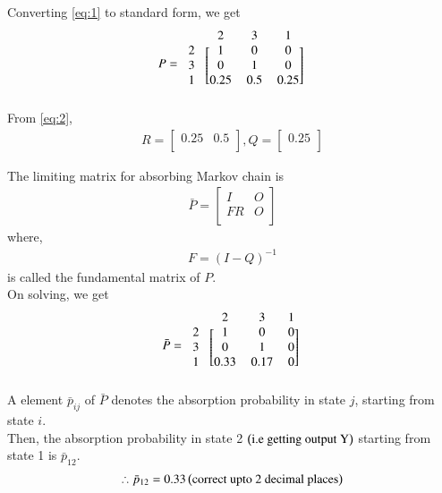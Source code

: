 \documentclass[journal,12pt,twocolumn]{IEEEtran}
\begin{document}
Converting \eqref{eq:1} to standard form, we get
\begin{align}
P=\begin{blockarray}{cccccc}
&2 & 3 & 1  \\
\begin{block}{c[ccccc]}
  2 & 1 & 0 & 0  \\
  3 & 0 & 1 & 0 \\
  1 & 0.25 & 0.5 & 0.25  \\
\end{block}
\end{blockarray}
\end{align}
From \eqref{eq:2},
\begin{align}
\tag{104.5}
\label{eq:r,q}
    R=\begin{bmatrix}
    0.25 & 0.5\\
    \end{bmatrix},
    Q=\begin{bmatrix}
    0.25\\
    \end{bmatrix}
\end{align}

The limiting matrix for absorbing Markov chain is
\begin{align}
\bar P=\begin{bmatrix}
    I & O\\
    FR & O\\
    \end{bmatrix}
\end{align}
where,
\begin{align}
F=(I-Q)^{-1}
\end{align}
is called the fundamental matrix of $P$. \\
On solving, we get
\begin{align}
\bar P=\begin{blockarray}{cccccc}
&2 & 3 & 1 \\
\begin{block}{c[ccccc]}
    2 & 1 & 0 & 0\\ 
    3 & 0 & 1 & 0\\ 
    1 & 0.33 & 0.17 & 0\\    
\end{block}
\end{blockarray}
\end{align}
A element $\bar p_{ij}$ of $\bar P$ denotes the absorption probability in state $j$, starting from state $i$. 
\\ Then, the absorption probability in state 2 $\left(\text{i.e getting output Y}\right)$ starting from state 1 is $\bar p_{12}$.
\begin{align}
\therefore \bar p_{12}=0.33 \left(\text{correct upto 2 decimal places}\right)
\end{align}
\end{document}
